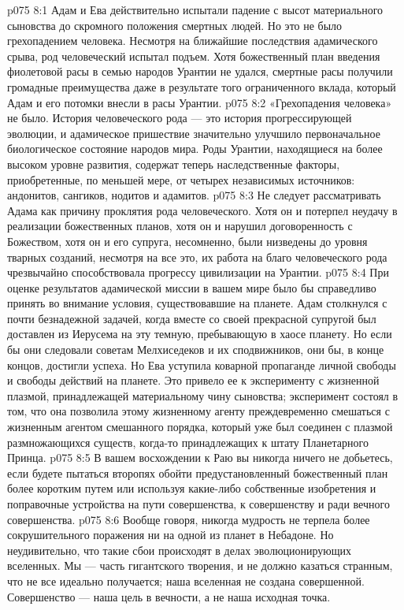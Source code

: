 \vs p075 8:1 Адам и Ева действительно испытали падение с высот материального сыновства до скромного положения смертных людей. Но это не было грехопадением человека. Несмотря на ближайшие последствия адамического срыва, род человеческий испытал подъем. Хотя божественный план введения фиолетовой расы в семью народов Урантии не удался, смертные расы получили громадные преимущества даже в результате того ограниченного вклада, который Адам и его потомки внесли в расы Урантии.
\vs p075 8:2 «Грехопадения человека» не было. История человеческого рода --- это история прогрессирующей эволюции, и адамическое пришествие значительно улучшило первоначальное биологическое состояние народов мира. Роды Урантии, находящиеся на более высоком уровне развития, содержат теперь наследственные факторы, приобретенные, по меньшей мере, от четырех независимых источников: андонитов, сангиков, нодитов и адамитов.
\vs p075 8:3 Не следует рассматривать Адама как причину проклятия рода человеческого. Хотя он и потерпел неудачу в реализации божественных планов, хотя он и нарушил договоренность с Божеством, хотя он и его супруга, несомненно, были низведены до уровня тварных созданий, несмотря на все это, их работа на благо человеческого рода чрезвычайно способствовала прогрессу цивилизации на Урантии.
\vs p075 8:4 \pc При оценке результатов адамической миссии в вашем мире было бы справедливо принять во внимание условия, существовавшие на планете. Адам столкнулся с почти безнадежной задачей, когда вместе со своей прекрасной супругой был доставлен из Иерусема на эту темную, пребывающую в хаосе планету. Но если бы они следовали советам Мелхиседеков и их сподвижников,  они бы, в конце концов, достигли успеха. Но Ева уступила коварной пропаганде личной свободы и свободы действий на планете. Это привело ее к эксперименту с жизненной плазмой, принадлежащей материальному чину сыновства; эксперимент состоял в том, что она позволила этому жизненному агенту преждевременно смешаться с жизненным агентом смешанного порядка, который уже был соединен с плазмой размножающихся существ, когда\hyp{}то принадлежащих к штату Планетарного Принца.
\vs p075 8:5 В вашем восхождении к Раю вы никогда ничего не добьетесь, если будете пытаться второпях обойти предустановленный божественный план более коротким путем или используя какие\hyp{}либо собственные изобретения и поправочные устройства на пути совершенства, к совершенству и ради вечного совершенства.
\vs p075 8:6 \pc Вообще говоря, никогда мудрость не терпела более сокрушительного поражения ни на одной из планет в Небадоне. Но неудивительно, что такие сбои происходят в делах эволюционирующих вселенных. Мы --- часть гигантского творения, и не должно казаться странным, что не все идеально получается; наша вселенная не создана совершенной. Совершенство --- наша цель в вечности, а не наша исходная точка.
